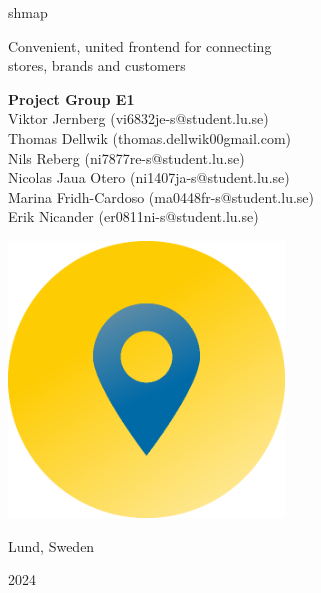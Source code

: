 \documentclass[titlepage]{article}
\def\companyName{shmap}
\begin{document}
\begin{titlepage}
    \begin{center}
        \vspace*{1.3cm}
        
        \begin{flushleft}

        {\selectfont
            {\Huge \companyName}
        }

        \vspace{0.5cm}
            {\large Convenient, united frontend for connecting\\
        stores, brands and customers}
            
        \vspace{1.25cm}
        
        \textbf{Project Group E1} \\
        {\normalsize
        Viktor Jernberg (vi6832je-s@student.lu.se)\\
        Thomas Dellwik (thomas.dellwik00gmail.com)\\
        Nils Reberg (ni7877re-s@student.lu.se)\\
        Nicolas Jaua Otero (ni1407ja-s@student.lu.se)\\
        Marina Fridh-Cardoso (ma0448fr-s@student.lu.se)\\
        Erik Nicander (er0811ni-s@student.lu.se)}
        
        \vspace{1.25cm}
        
        \hfill\includegraphics[width=0.55\textwidth]{logo_gradient.png}
       
        \vspace{1cm}

        {\large Lund, Sweden}

        \vspace{0.2cm}
        
        {\large 2024}
        
        \end{flushleft}
            
    \end{center}
\end{titlepage}
\end{document}
